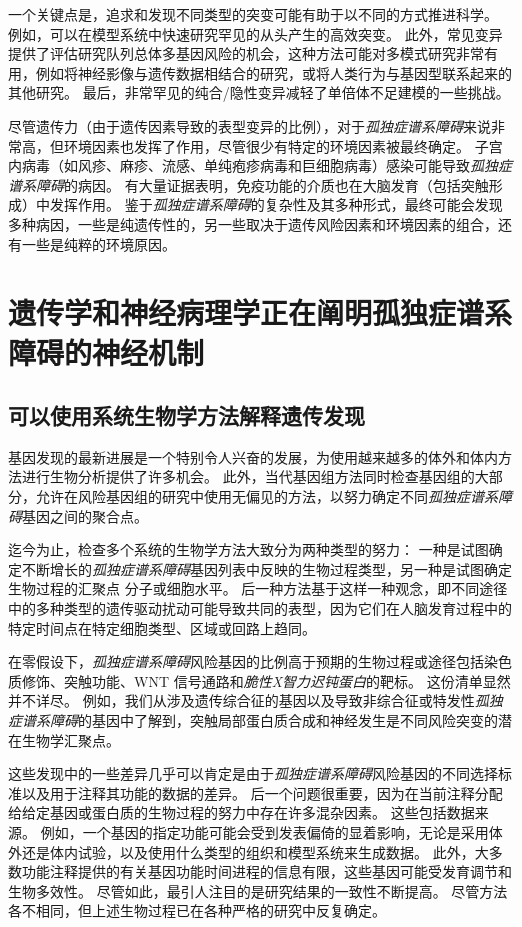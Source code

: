 一个关键点是，追求和发现不同类型的突变可能有助于以不同的方式推进科学。
例如，可以在模型系统中快速研究罕见的从头产生的高效突变。
此外，常见变异提供了评估研究队列总体多基因风险的机会，这种方法可能对多模式研究非常有用，例如将神经影像与遗传数据相结合的研究，或将人类行为与基因型联系起来的其他研究。
最后，非常罕见的纯合/隐性变异减轻了单倍体不足建模的一些挑战。


尽管遗传力（由于遗传因素导致的表型变异的比例），对于\textit{孤独症谱系障碍}来说非常高，但环境因素也发挥了作用，尽管很少有特定的环境因素被最终确定。
子宫内病毒（如风疹、麻疹、流感、单纯疱疹病毒和巨细胞病毒）感染可能导致\textit{孤独症谱系障碍}的病因。
有大量证据表明，免疫功能的介质也在大脑发育（包括突触形成）中发挥作用。
鉴于\textit{孤独症谱系障碍}的复杂性及其多种形式，最终可能会发现多种病因，一些是纯遗传性的，另一些取决于遗传风险因素和环境因素的组合，还有一些是纯粹的环境原因。



\section{遗传学和神经病理学正在阐明孤独症谱系障碍的神经机制}

\subsection{可以使用系统生物学方法解释遗传发现}

基因发现的最新进展是一个特别令人兴奋的发展，为使用越来越多的体外和体内方法进行生物分析提供了许多机会。
此外，当代基因组方法同时检查基因组的大部分，允许在风险基因组的研究中使用无偏见的方法，以努力确定不同\textit{孤独症谱系障碍}基因之间的聚合点。


迄今为止，检查多个系统的生物学方法大致分为两种类型的努力：
一种是试图确定不断增长的\textit{孤独症谱系障碍}基因列表中反映的生物过程类型，另一种是试图确定生物过程的汇聚点 分子或细胞水平。
后一种方法基于这样一种观念，即不同途径中的多种类型的遗传驱动扰动可能导致共同的表型，因为它们在人脑发育过程中的特定时间点在特定细胞类型、区域或回路上趋同。


在零假设下，\textit{孤独症谱系障碍}风险基因的比例高于预期的生物过程或途径包括染色质修饰、突触功能、WNT 信号通路和\textit{脆性X智力迟钝蛋白}的靶标。
这份清单显然并不详尽。
例如，我们从涉及遗传综合征的基因以及导致非综合征或特发性\textit{孤独症谱系障碍}的基因中了解到，突触局部蛋白质合成和神经发生是不同风险突变的潜在生物学汇聚点。


这些发现中的一些差异几乎可以肯定是由于\textit{孤独症谱系障碍}风险基因的不同选择标准以及用于注释其功能的数据的差异。
后一个问题很重要，因为在当前注释分配给给定基因或蛋白质的生物过程的努力中存在许多混杂因素。
这些包括数据来源。
例如，一个基因的指定功能可能会受到发表偏倚的显着影响，无论是采用体外还是体内试验，以及使用什么类型的组织和模型系统来生成数据。
此外，大多数功能注释提供的有关基因功能时间进程的信息有限，这些基因可能受发育调节和生物多效性。
尽管如此，最引人注目的是研究结果的一致性不断提高。
尽管方法各不相同，但上述生物过程已在各种严格的研究中反复确定。


